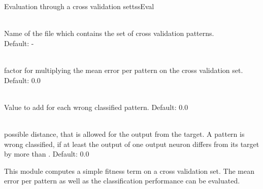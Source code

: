 \begin{moduledoc}{Evaluation through a cross validation set}{tssEval}

\item[\KeyWord{crossPattern} \optParam{name}]~\\
Name of the file which contains the set of cross validation patterns.\\
Default: -

\item[\KeyWord{crossTssRating} \optParam{ x } ]~\\
    factor for multiplying the mean error per pattern on the cross validation set.
    Default: 0.0

  \item[\KeyWord{crossHamRating} \optParam{ x } ]~\\
    Value to add for each wrong classified pattern.
    Default: 0.0

  \item[\KeyWord{crossHamThresh} \optParam{ x } ]~\\
    possible distance, that is allowed for the output from the target.
    A pattern is wrong classified, if at least the output of
    one output neuron differs from its target by	
    more than .
    Default: 0.0
\end{moduledoc}

This module computes a simple fitness term on a cross validation set.
The mean error per pattern as well as the classification performance
can be evaluated.

